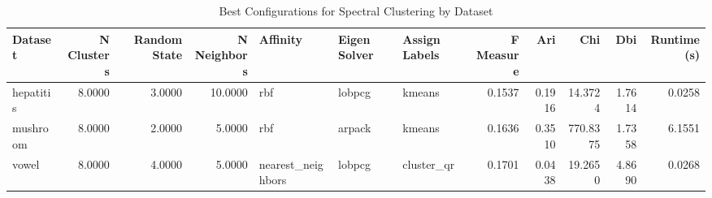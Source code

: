 \begin{table*}[ht!]
\caption{Best Configurations for Spectral Clustering by Dataset}
\label{tab:best_configs_spectral_clustering}
\begin{tabular}{lrrrlllrrrrr}
Dataset & N Clusters & Random State & N Neighbors & Affinity & Eigen Solver & Assign Labels & F Measure & Ari & Chi & Dbi & Runtime (s) \\\midrule

hepatitis & 8.0000 & 3.0000 & 10.0000 & rbf & lobpcg & kmeans & 0.1537 & 0.1916 & 14.3724 & 1.7614 & 0.0258 \\
mushroom & 8.0000 & 2.0000 & 5.0000 & rbf & arpack & kmeans & 0.1636 & 0.3510 & 770.8375 & 1.7358 & 6.1551 \\
vowel & 8.0000 & 4.0000 & 5.0000 & nearest\_neighbors & lobpcg & cluster\_qr & 0.1701 & 0.0438 & 19.2650 & 4.8690 & 0.0268 \\
\end{tabular}
\end{table*}
